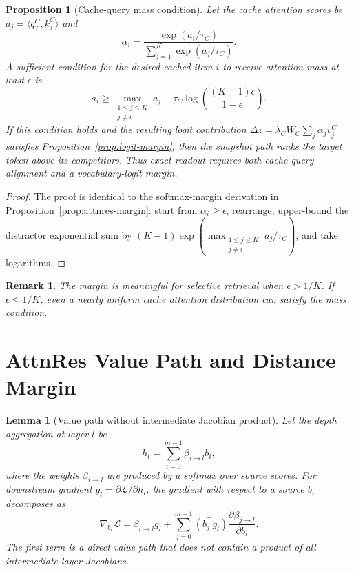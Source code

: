 \documentclass[11pt]{article}
\newtheorem{lemma}[theorem]{Lemma}
\newtheorem{proposition}[theorem]{Proposition}
\newtheorem{remark}[theorem]{Remark}
\begin{document}
\begin{proposition}[Cache-query mass condition]
\label{prop:cache-mass}
Let the cache attention scores be $a_j=\langle q_T^C,k_j^C\rangle$ and
\begin{equation}
\alpha_i=\frac{\exp(a_i/\tau_C)}{\sum_{j=1}^{K}\exp(a_j/\tau_C)}.
\end{equation}
A sufficient condition for the desired cached item $i$ to receive attention mass at least $\epsilon$ is
\begin{equation}
\label{eq:cache-mass-margin}
a_i\geq \max_{\substack{1\le j\le K\\ j\ne i}}a_j+\tau_C\log\left(\frac{(K-1)\epsilon}{1-\epsilon}\right).
\end{equation}
If this condition holds and the resulting logit contribution $\Delta z=\lambda_CW_C\sum_j\alpha_jv_j^C$ satisfies Proposition~\ref{prop:logit-margin}, then the snapshot path ranks the target token above its competitors. Thus exact readout requires both cache-query alignment and a vocabulary-logit margin.
\end{proposition}

\begin{proof}
The proof is identical to the softmax-margin derivation in Proposition~\ref{prop:attnres-margin}: start from $\alpha_i\geq\epsilon$, rearrange, upper-bound the distractor exponential sum by $(K-1)\exp(\max_{\substack{1\le j\le K\\ j\ne i}}a_j/\tau_C)$, and take logarithms.
\end{proof}

\begin{remark}
The margin is meaningful for selective retrieval when $\epsilon>1/K$. If $\epsilon\leq 1/K$, even a nearly uniform cache attention distribution can satisfy the mass condition.
\end{remark}

\section{AttnRes Value Path and Distance Margin}
\label{app:attnres-margin}

\begin{lemma}[Value path without intermediate Jacobian product]
Let the depth aggregation at layer $l$ be
\begin{equation}
h_l=\sum_{i=0}^{m-1}\beta_{i\to l}b_i,
\end{equation}
where the weights $\beta_{i\to l}$ are produced by a softmax over source scores. For downstream gradient $g_l=\partial \mathcal{L}/\partial h_l$, the gradient with respect to a source $b_i$ decomposes as
\begin{equation}
\nabla_{b_i}\mathcal{L}
=\beta_{i\to l}g_l + \sum_{j=0}^{m-1}(b_j^\top g_l)\frac{\partial \beta_{j\to l}}{\partial b_i}.
\end{equation}
The first term is a direct value path that does not contain a product of all intermediate layer Jacobians.
\end{lemma}
\end{document}
